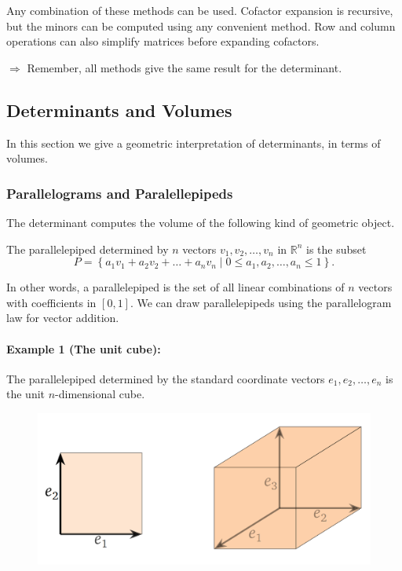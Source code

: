 \documentclass[a4paper,12pt]{article}
\begin{document}
Any combination of these methods can be used. Cofactor expansion is recursive, but the minors can be computed using any convenient method. Row and column operations can also simplify matrices before expanding cofactors.
\begin{tcolorbox}[title=Attention,colframe=blue!70!black, colback=blue!5!white]
$\Rightarrow$ Remember, all methods give the same result for the determinant.
\end{tcolorbox}

\newpage

\subsection{Determinants and Volumes}In this section we give a geometric interpretation of determinants, in terms of volumes.
\subsubsection{Parallelograms and Paralellepipeds}The determinant computes the volume of the following kind of geometric object.

\begin{tcolorbox}[title=Definition,colframe=blue!70!black, colback=blue!5!white]
The parallelepiped determined by \( n \) vectors \( v_1, v_2, \dots, v_n \) in \( \mathbb{R}^n \) is the subset
\[
P = \left\{ a_1 v_1 + a_2 v_2 + \dots + a_n v_n \mid 0 \leq a_1, a_2, \dots, a_n \leq 1 \right\}.
\]

\end{tcolorbox}
In other words, a parallelepiped is the set of all linear combinations of \( n \) vectors with coefficients in \( [0, 1] \). We can draw parallelepipeds using the parallelogram law for vector addition.

\paragraph{Example 1 (The unit cube):}The parallelepiped determined by the standard coordinate vectors \( e_1, e_2, \dots, e_n \) is the unit \( n \)-dimensional cube.

\begin{figure}[H]
    \centering
    \includegraphics[width=0.5\linewidth]{cubedetage.png}
\end{figure}
\end{document}
